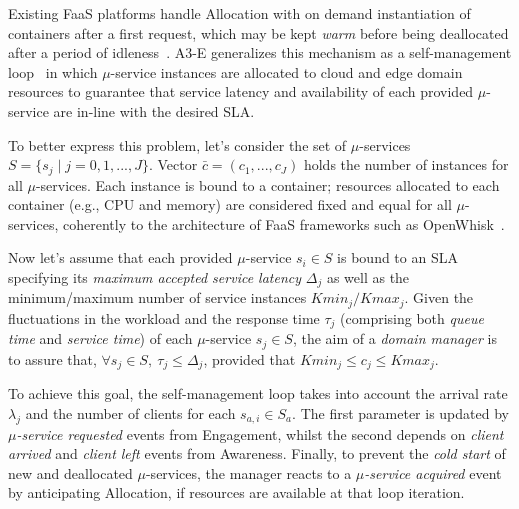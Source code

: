 

Existing FaaS platforms handle Allocation with on demand instantiation of containers after a first request, which may be kept \textit{warm} before being deallocated after a period of idleness~\cite{AWSLambda, OpenWhisk}. A3-E generalizes this mechanism as a self-management loop~\cite{kephart2003vision}
in which $\mu$-service instances are allocated to cloud and edge domain resources to guarantee that service latency and availability of each provided $\mu$-service are in-line with the desired SLA. 

To better express this problem, let's consider the set of $\mu$-services $S = \{s_j \mid j = 0,1,...,J\}$.
Vector $\bar{c} = (c_1, ..., c_J)$ holds the number of instances for all $\mu$-services. Each instance is bound to a container; resources allocated to each container 
(e.g., CPU and memory) are considered fixed and equal for all $\mu$-services, coherently to the architecture of FaaS frameworks such as OpenWhisk~\cite{OpenWhisk}.

Now let's assume that each provided $\mu$-service $s_i \in S$ is bound to an SLA specifying its \textit{maximum accepted service latency} $\Delta_j$ 
as well as the minimum/maximum number of service instances $Kmin_{j}/Kmax_{j}$. %
Given the fluctuations in the workload and the response time $\tau_j$ (comprising both \textit{queue time} and \textit{service time}) of each $\mu$-service $s_j \in S$, the aim of a \textit{domain manager} is to assure that, $\forall s_j \in S,\ \tau_j \le \Delta_j$, provided that $Kmin_j \le c_j \le Kmax_j$. 

To achieve this goal, the self-management loop takes into account the arrival rate $\lambda_j$ and the number of clients for each $s_{a,i} \in S_a$. The first parameter is updated by \textit{$\mu$-service requested} events from Engagement, whilst the second depends on \textit{client arrived} and \textit{client left} events from Awareness. Finally, to prevent the \textit{cold start} of new and deallocated $\mu$-services, the manager reacts to a \textit{$\mu$-service acquired} event by anticipating Allocation, if resources are available at that loop iteration. 

